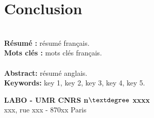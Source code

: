 \documentclass[a4paper,12pt,oneside]{book}
\begin{document}
\newpage
   
   \newpage
   



\newpage
\onehalfspacing
\chapter*{Conclusion}
\newpage



\newpage

\newpage


\newpage
\thispagestyle{empty}
\null
\newpage

\newpage
\thispagestyle{empty}
\singlespacing

	\hspace{-6.5mm}
  \\ [3mm]
   
\textbf{Résumé :} résumé français.\\

\textbf{Mots clés :} mots clés français.\\[3mm]

	\hspace{-8.5mm}
  \\[3mm]
   
\textbf{Abstract:} résumé anglais.\\

\textbf{Keywords:} key 1, key 2, key 3, key 4, key 5.

\begin{center}
\textbf{LABO - UMR CNRS n$\textdegree$ xxxx}\\
xxx, rue xxx - 870xx Paris
\end{center}
\end{document}
